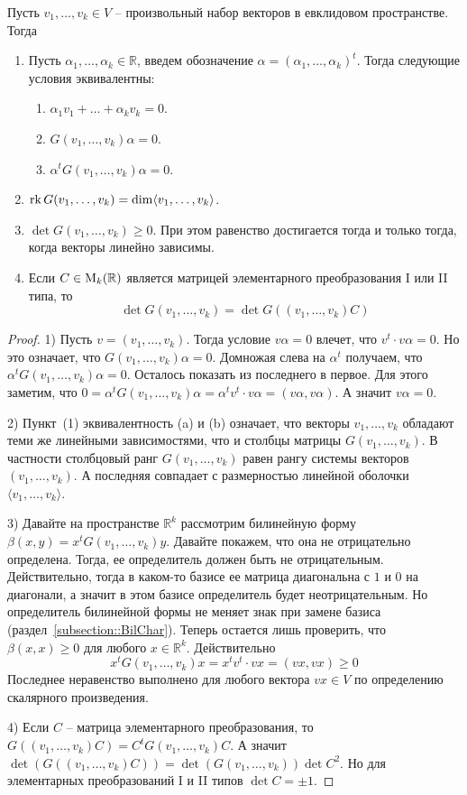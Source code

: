 \begin{claim}\label{claim::GramMatrixFull}
Пусть $v_1,\ldots,v_k\in V$ -- произвольный набор векторов в евклидовом пространстве. Тогда
\begin{enumerate}
\item Пусть $\alpha_1,\ldots,\alpha_k \in \mathbb R$, введем обозначение $\alpha = (\alpha_1,\ldots,\alpha_k)^t$. Тогда следующие условия эквивалентны:
\begin{enumerate}
\item $\alpha_1 v_1 + \ldots + \alpha_k v_k = 0$.
\item $G(v_1,\ldots,v_k)\alpha= 0$.
\item $\alpha^tG(v_1,\ldots,v_k)\alpha= 0$.
\end{enumerate}
\item $\operatorname{rk} G(v_1,\ldots,v_k) = \dim \langle v_1,\ldots,v_k\rangle$.
\item  $\det G(v_1,\ldots,v_k)\geqslant 0$. При этом равенство достигается тогда и только тогда, когда векторы линейно зависимы.
\item Если $C\in\operatorname{M}_{k}(\mathbb R)$ является матрицей элементарного преобразования I или II типа, то 
\[
\det G(v_1,\ldots,v_k) = \det G((v_1,\ldots,v_k)C)
\]
\end{enumerate}
\end{claim}
\begin{proof}
1) Пусть $v = (v_1,\ldots,v_k)$. Тогда условие $v\alpha = 0$ влечет, что $v^t \cdot v\alpha = 0$. Но это означает, что $G(v_1,\ldots,v_k) \alpha = 0$. Домножая слева на $\alpha^t$ получаем, что $\alpha^t G(v_1,\ldots,v_k) \alpha = 0$. Осталось показать из последнего в первое. Для этого заметим, что $0 = \alpha^t G(v_1,\ldots,v_k) \alpha = \alpha^t v^t \cdot v\alpha = (v\alpha, v\alpha)$. А значит $v\alpha = 0$.

2) Пункт~(1) эквивалентность (a) и (b) означает, что векторы $v_1,\ldots,v_k$ обладают теми же линейными зависимостями, что и столбцы матрицы $G(v_1,\ldots,v_k)$. В частности столбцовый ранг $G(v_1,\ldots,v_k)$ равен рангу системы векторов $(v_1,\ldots,v_k)$. А последняя совпадает с размерностью линейной оболочки $\langle v_1,\ldots,v_k\rangle$.

3) Давайте на пространстве $\mathbb R^k$ рассмотрим билинейную форму $\beta(x,y) = x^t G(v_1,\ldots,v_k)y$. Давайте покажем, что она не отрицательно определена. Тогда, ее определитель должен быть не отрицательным. Действительно, тогда в каком-то базисе ее матрица диагональна с $1$ и $0$ на диагонали, а значит в этом базисе определитель будет неотрицательным. Но определитель билинейной формы не меняет знак при замене базиса (раздел~\ref{subsection::BilChar}). Теперь остается лишь проверить, что $\beta(x,x)\geqslant 0$ для любого $x\in \mathbb R^k$. Действительно
\[
x^t G(v_1,\ldots,v_k) x = x^t v^t\cdot v x = (vx, vx) \geqslant 0
\]
Последнее неравенство выполнено для любого вектора $vx\in V$ по определению скалярного произведения.

4) Если $C$ -- матрица элементарного преобразования, то $G((v_1,\ldots,v_k)C) = C^t G(v_1,\ldots,v_k)C$. А значит $\det(G((v_1,\ldots,v_k)C)) = \det(G(v_1,\ldots,v_k))\det C^2$. Но для элементарных преобразований I и II типов $\det C = \pm 1$.
\end{proof}

